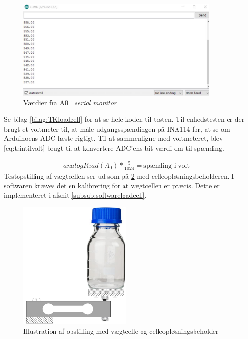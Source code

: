 \begin{figure}[H]
	\centering
	\includegraphics[width=0.9\textwidth]{billeder/Hardware/diagrammer/loadcellunittestbits.JPG}
	\caption{Værdier fra A0 i \textit{serial monitor}}
	\label{fig:loadcell_test}
\end{figure}

 Se bilag \ref{bilag:TKloadcell} for at se hele koden til testen. Til enhedstesten er der brugt et voltmeter til, at måle udgangsspændingen på INA114 for, at se om Arduinoens ADC læste rigtigt. Til at sammenligne med voltmeteret, blev \ref{eq:trintilvolt} brugt til at konvertere ADC'ens bit værdi om til spænding.
 
 \begin{align}
 analogRead(A_0)*\frac{5}{1024}=\text{spænding i volt}
 \label{eq:trintilvolt}
 \end{align}
Testopstilling af vægtcellen ser ud som på \ref{fig:loadcell_mont} med celleopløsningsbeholderen. I softwaren kræves det en kalibrering for at vægtcellen er præcis. Dette er implementeret i afsnit \ref{subsub:softwareloadcell}.
 
 \begin{figure}[H]
	\centering
	\includegraphics[width=0.5\textwidth]{billeder/Hardware/diagrammer/loadcell_montering.pdf}
	\caption{Illustration af opstilling med vægtcelle og celleopløsningsbeholder}
	\label{fig:loadcell_mont}
\end{figure}

